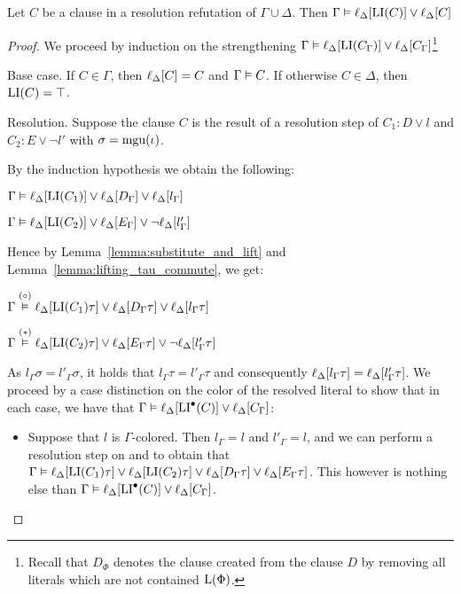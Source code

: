 \documentclass[,%
	draft=false,%
	numbers=noendperiod
	11pt,
	a4paper,
	oneside,%
	openany,
]{memoir}
\begin{document}
\begin{lemma}
	\label{lemma:gamma_entails_delta_lifted_invariant}
	Let $C$ be a clause in a resolution refutation of $\Gamma \cup \Delta$.
	Then
	$\Gamma \vDash \ell_{\Delta}[ \operatorname{LI}(C) ] \lor \ell_{\Delta}[C] $
\end{lemma}
\begin{proof}
	We proceed by induction on the strengthening
	$\Gamma \vDash \ell_{\Delta}[ \operatorname{LI}(C_\Gamma) ] \lor \ell_{\Delta}[C_\Gamma] $\footnote{Recall that $D_\Phi$ denotes the clause created from the clause $D$ by removing all literals which are not contained $\operatorname{L}(\Phi)$.}

	\begin{description}
		\item{} Base case.
			If $C\in \Gamma$, then $\ell_{\Delta}[C] = C$ and $\Gamma \vDash C$.
			If otherwise $C \in \Delta$, then $\operatorname{LI}(C) = \top$.

		\item{} Resolution.
			Suppose the clause $C$ is the result of a resolution step \inference{} of $C_1: D \lor l$ and $C_2: E \lor \lnot l'$ with $\sigma = \operatorname{mgu}(\iota)$.

			By the induction hypothesis we obtain the following:

			$\Gamma \vDash \ell_{\Delta}[\operatorname{LI}(C_1)] \lor \ell_{\Delta}[D_\Gamma] \lor \ell_{\Delta}[l_\Gamma]$

			$\Gamma \vDash \ell_{\Delta}[\operatorname{LI}(C_2)] \lor \ell_{\Delta}[E_\Gamma] \lor \lnot \ell_{\Delta}[l'_\Gamma]$

			Hence by Lemma~\ref{lemma:substitute_and_lift} and Lemma~\ref{lemma:lifting_tau_commute}, we get:

			$\Gamma \stackrel{(\circ)}{\vDash} \ell_{\Delta}[\operatorname{LI}(C_1)\tau] \lor \ell_{\Delta}[D_\Gamma\tau] \lor \ell_{\Delta}[l_\Gamma\tau]$

			$\Gamma \stackrel{(*)}{\vDash} \ell_{\Delta}[\operatorname{LI}(C_2)\tau] \lor \ell_{\Delta}[E_\Gamma\tau] \lor \lnot \ell_{\Delta}[l'_\Gamma\tau]$

			As $l_\Gamma\sigma = l'_\Gamma\sigma$,
			it holds that $l_\Gamma\tau = l'_\Gamma\tau$ and consequently 
			$\ell_{\Delta}[l_\Gamma\tau] = \ell_{\Delta}[l'_\Gamma\tau]$.
			We proceed by a case distinction on the color of the resolved literal to show that in each case, we have that
			$\Gamma \vDash \ell_{\Delta}[\operatorname{LI}^\bullet(C)] \lor \ell_{\Delta}[C_\Gamma]$:
			\begin{itemize}
				\item Suppose that $l$ is $\Gamma$-colored.
					Then $l_\Gamma = l$ and $l'_\Gamma = l$, and we can perform a resolution step on \markA{} and \markB{} to obtain that
					$\Gamma \vDash
					\ell_{\Delta}[\operatorname{LI}(C_1)\tau] \lor
					\ell_{\Delta}[\operatorname{LI}(C_2)\tau] \lor 
					\ell_{\Delta}[D_\Gamma\tau]  \lor
					\ell_{\Delta}[E_\Gamma\tau]$.
					This however is nothing else than $\Gamma \vDash \ell_{\Delta}[\operatorname{LI}^\bullet(C)] \lor \ell_{\Delta}[C_\Gamma]$.


\end{itemize}
\end{description}
\end{proof}
\end{document}
